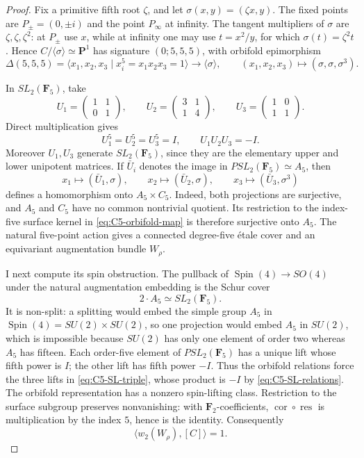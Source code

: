 \documentclass[11pt,reqno]{amsart}
\numberwithin{equation}{section}
\theoremstyle{remark}
\begin{document}
\begin{proof}
Fix a primitive fifth root \(\zeta\), and let
\(\sigma(x,y)=(\zeta x,y)\).  The fixed points are
\(P_\pm=(0,\pm i)\) and the point \(P_\infty\) at infinity.  The
tangent multipliers of \(\sigma\) are \(\zeta,\zeta,\zeta^2\): at
\(P_\pm\) use \(x\), while at infinity one may use
\(t=x^2/y\), for which \(\sigma(t)=\zeta^2t\).  Hence
\(C/\langle\sigma\rangle\simeq\mathbf P^1\) has signature
\((0;5,5,5)\), with orbifold epimorphism
\[
 \Delta(5,5,5)=
 \langle x_1,x_2,x_3\mid x_i^5=x_1x_2x_3=1\rangle
 \longrightarrow\langle\sigma\rangle,
 \qquad (x_1,x_2,x_3)\longmapsto(\sigma,\sigma,\sigma^3).
\tag{6.29}\label{eq:C5-orbifold-map}
\]

In \(SL_2(\mathbf F_5)\), take
\[
 U_1=\begin{pmatrix}1&1\\0&1\end{pmatrix},\qquad
 U_2=\begin{pmatrix}3&1\\1&4\end{pmatrix},\qquad
 U_3=\begin{pmatrix}1&0\\1&1\end{pmatrix}.
\tag{6.30}\label{eq:C5-SL-triple}
\]
Direct multiplication gives
\[
 U_1^5=U_2^5=U_3^5=I,\qquad U_1U_2U_3=-I.
\tag{6.31}\label{eq:C5-SL-relations}
\]
Moreover \(U_1,U_3\) generate \(SL_2(\mathbf F_5)\), since they are
the elementary upper and lower unipotent matrices.  If
\(\bar U_i\) denotes the image in
\(PSL_2(\mathbf F_5)\simeq A_5\), then
\[
 x_1\longmapsto(\bar U_1,\sigma),\qquad
 x_2\longmapsto(\bar U_2,\sigma),\qquad
 x_3\longmapsto(\bar U_3,\sigma^3)
\tag{6.32}\label{eq:C5-extension-map}
\]
defines a homomorphism onto \(A_5\times C_5\).  Indeed, both
projections are surjective, and \(A_5\) and \(C_5\) have no common
nontrivial quotient.  Its restriction to the index-five surface
kernel in \eqref{eq:C5-orbifold-map} is therefore surjective onto
\(A_5\).  The natural five-point action gives a connected degree-five
\'etale cover and an equivariant augmentation bundle
\(W_\rho\).

I next compute its spin obstruction.  The pullback of
\(\operatorname{Spin}(4)\to SO(4)\) under the natural augmentation
embedding is the Schur cover
\[
 2\!\cdot\!A_5\simeq SL_2(\mathbf F_5).
\]
It is non-split: a splitting would embed the simple group \(A_5\) in
\(\operatorname{Spin}(4)=SU(2)\times SU(2)\), so one projection would
embed \(A_5\) in \(SU(2)\), which is impossible because \(SU(2)\) has
only one element of order two whereas \(A_5\) has fifteen.
Each order-five element of \(PSL_2(\mathbf F_5)\) has a unique lift
whose fifth power is \(I\); the other lift has fifth power \(-I\).
Thus the orbifold relations force the three lifts in
\eqref{eq:C5-SL-triple}, whose product is \(-I\) by
\eqref{eq:C5-SL-relations}.  The orbifold representation has a nonzero
spin-lifting class.  Restriction to the surface subgroup preserves
nonvanishing: with \(\mathbf F_2\)-coefficients,
\(\operatorname{cor}\circ\operatorname{res}\) is multiplication by
the index \(5\), hence is the identity.  Consequently
\[
 \langle w_2(W_\rho),[C]\rangle=1.
\tag{6.33}\label{eq:C5-w2-one}
\]


\end{proof}
\end{document}
